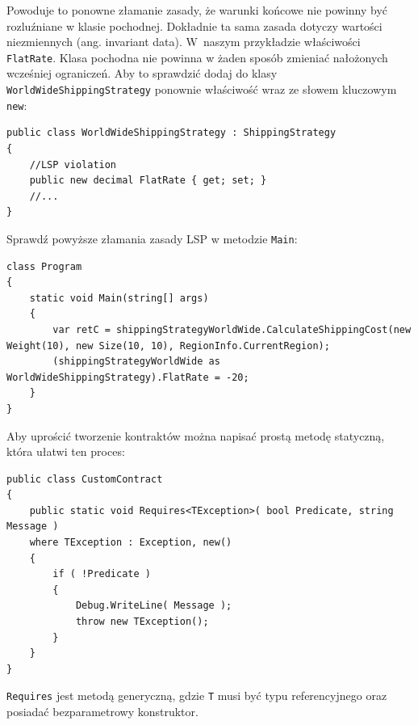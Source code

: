 Powoduje to ponowne złamanie zasady, że warunki końcowe nie powinny być rozluźniane w klasie pochodnej. Dokładnie ta sama zasada dotyczy wartości niezmiennych (ang. invariant data). W~naszym przykładzie właściwości \texttt{FlatRate}. Klasa pochodna nie powinna w żaden sposób zmieniać nałożonych wcześniej ograniczeń. Aby to sprawdzić dodaj do klasy \texttt{WorldWideShippingStrategy} ponownie właściwość wraz ze słowem kluczowym \texttt{new}:
\begin{lstlisting}
public class WorldWideShippingStrategy : ShippingStrategy
{
	//LSP violation
	public new decimal FlatRate { get; set; }
	//...
}
\end{lstlisting}

Sprawdź powyższe złamania zasady LSP w metodzie \texttt{Main}:
\begin{lstlisting}
class Program
{
	static void Main(string[] args)
	{
		var retC = shippingStrategyWorldWide.CalculateShippingCost(new Weight(10), new Size(10, 10), RegionInfo.CurrentRegion);
		(shippingStrategyWorldWide as WorldWideShippingStrategy).FlatRate = -20;
	}
}
\end{lstlisting}

Aby uprościć tworzenie kontraktów można napisać prostą metodę statyczną, która ułatwi ten proces:
\begin{lstlisting}
public class CustomContract
{
	public static void Requires<TException>( bool Predicate, string Message )
	where TException : Exception, new()
	{
		if ( !Predicate )
		{
			Debug.WriteLine( Message );
			throw new TException();
		}
	}
}  	
\end{lstlisting}

\texttt{Requires} jest metodą generyczną, gdzie \texttt{T} musi być typu referencyjnego oraz posiadać bezparametrowy konstruktor.




